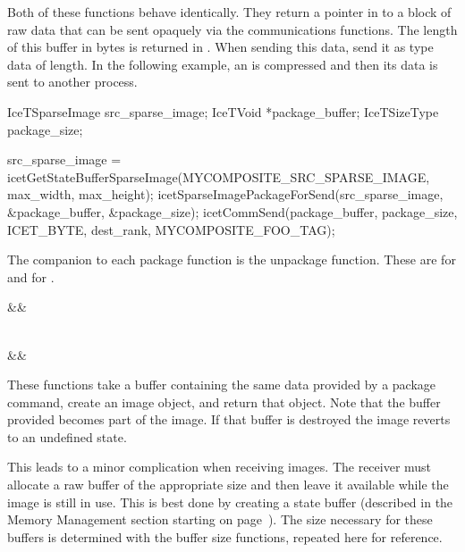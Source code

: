 Both of these functions behave identically.  They return a pointer in
 to a block of raw data that can be sent opaquely via the
communications functions.  The length of this buffer in bytes is returned
in .  When sending this data, send it as  type
data of  length.  In the following example, an  is
compressed and then its data is sent to another process.

\begin{code}
IceTSparseImage src_sparse_image;
IceTVoid *package_buffer;
IceTSizeType package_size;

src_sparse_image = icetGetStateBufferSparseImage(MYCOMPOSITE_SRC_SPARSE_IMAGE,
                                                 max_width, max_height);
icetSparseImagePackageForSend(src_sparse_image, &package_buffer, &package_size);
icetCommSend(package_buffer, package_size, ICET_BYTE, dest_rank,
             MYCOMPOSITE_FOO_TAG);
\end{code}

The companion to each package function is the unpackage function.  These
are  for  and
 for .

\label{manpage:icetImageUnpackageFromReceive}
\begin{Table}{3}
  \textC{ }\textC{(}&&\quad\textC{);}
\end{Table}

\label{manpage:icetSparseImageUnpackageFromReceive}
\begin{Table}{3}
   \\
  \makebox[4in]{}
  &&\quad\textC{);}
\end{Table}

These functions take a buffer containing the same data provided by a
package command, create an image object, and return that object.  Note that
the buffer provided becomes part of the image.  If that buffer is destroyed
the image reverts to an undefined state.

This leads to a minor complication when receiving images.  The receiver
must allocate a raw buffer of the appropriate size and then leave it
available while the image is still in use.  This is best done by creating a
state buffer (described in the Memory Management
section starting on page~\pageref{sec:Strategies:New:Memory_Management}).
The size necessary for these buffers is determined with the buffer size
functions, repeated here for reference.

